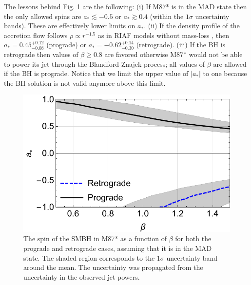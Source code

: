 \documentclass[twocolumn]{aastex62} %
\begin{document}
The lessons behind Fig. \ref{spins} are the following: (i) If M87* is in the MAD state then the only allowed spins are $a_* \lesssim -0.5$ or $a_* \gtrsim 0.4$ (within the $1\sigma$ uncertainty bands). These are effectively lower limits on $a_*$. (ii) If the density profile of the accretion flow follows $\rho \propto r^{-1.5}$ as in RIAF models without mass-loss , then $a_* = 0.45^{+0.12}_{-0.08}$ (prograde) or $a_* = -0.62^{+0.14}_{-0.30}$ (retrograde). (iii) If the BH is retrograde then values of $\beta \geq 0.8$ are favored otherwise M87* would not be able to power its jet through the Blandford-Znajek process; all values of $\beta$ are allowed if the BH is prograde.
Notice that we limit the upper value of $|a_*|$ to one because the BH solution is not valid anymore above this limit.

\begin{figure}[h]
\centering
\includegraphics[width=\linewidth]{figures/spins-MAD.pdf}
\caption{The spin of the SMBH in M87* as a function of $\beta$ for both the prograde and retrograde cases, assuming that it is in the MAD state. The shaded region corresponds to the $1\sigma$ uncertainty band around the mean. The uncertainty was propagated from the uncertainty in the observed jet powers. }
\label{spins}
\end{figure}
\end{document}
